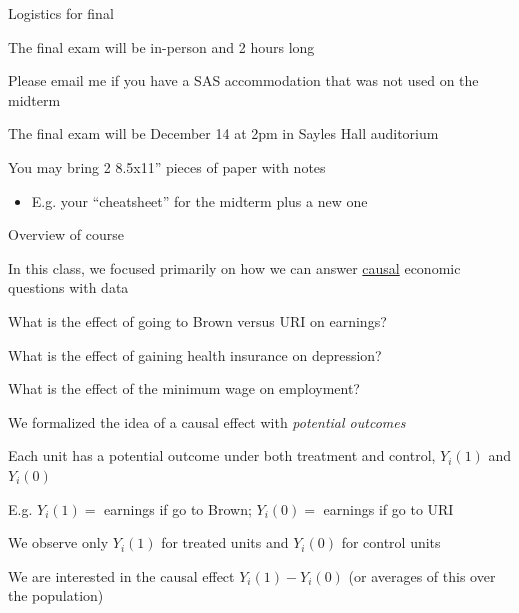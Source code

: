 \documentclass[11pt,english,handout]{beamer}
\newenvironment{wideitemize}{\itemize\addtolength{\itemsep}{10pt}}{\enditemize}
\begin{document}
\begin{frame}{Logistics for final}
	\begin{wideitemize}
		
		\item
		The final exam will be in-person and 2 hours long
			\begin{wideitemize}
				\item
				Please email me if you have a SAS accommodation that was not used on the midterm
				
			\end{wideitemize}
		
		\item
		The final exam will be December 14 at 2pm in Sayles Hall auditorium
		
		\item
		You may bring 2 8.5x11'' pieces of paper with notes
			\begin{itemize}
				\item 
				E.g. your ``cheatsheet'' for the midterm plus a new one
			\end{itemize}
		
	\end{wideitemize}
\end{frame}

\begin{frame}{Overview of course}
	\begin{wideitemize}
		\item
		In this class, we focused primarily on how we can answer \underline{causal} economic questions with data
			\begin{wideitemize}
				\item
				What is the effect of going to Brown versus URI on earnings? 
				
				\item
				What is the effect of gaining health insurance on depression? 
				
				\item
				What is the effect of the minimum wage on employment?
			\end{wideitemize}
		
		\pause
		\item
		We formalized the idea of a causal effect with \textit{potential outcomes}
			\begin{wideitemize}
				\item 
				Each unit has a potential outcome under both treatment and control, $Y_i(1)$ and $Y_i(0)$
				
				\item
				E.g. $Y_i(1) =$ earnings if go to Brown; $Y_i(0)=$ earnings if go to URI
				
				\item
				We observe only $Y_i(1)$ for treated units and $Y_i(0)$ for control units
				
				\item
				We are interested in the causal effect $Y_i(1) - Y_i(0)$ (or averages of this over the population) 
			\end{wideitemize}
	\end{wideitemize}
\end{frame}
\end{document}

